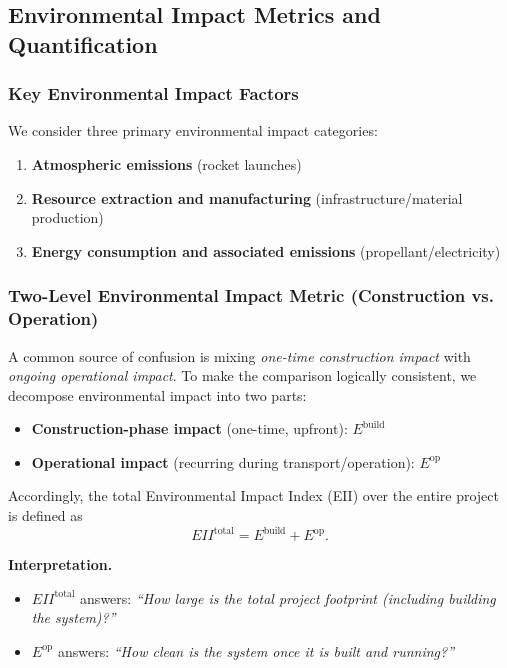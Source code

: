 \documentclass{mcmthesis}
\begin{document}

\subsection{Environmental Impact Metrics and Quantification}

\subsubsection{Key Environmental Impact Factors}

We consider three primary environmental impact categories:
\begin{enumerate}
    \item \textbf{Atmospheric emissions} (rocket launches)
    \item \textbf{Resource extraction and manufacturing} (infrastructure/material production)
    \item \textbf{Energy consumption and associated emissions} (propellant/electricity)
\end{enumerate}

\subsubsection{Two-Level Environmental Impact Metric (Construction vs. Operation)}

A common source of confusion is mixing \emph{one-time construction impact} with \emph{ongoing operational impact}.
To make the comparison logically consistent, we decompose environmental impact into two parts:

\begin{itemize}
    \item \textbf{Construction-phase impact} (one-time, upfront): $E^{\text{build}}$
    \item \textbf{Operational impact} (recurring during transport/operation): $E^{\text{op}}$
\end{itemize}

Accordingly, the total Environmental Impact Index (EII) over the entire project is defined as
\begin{equation}
    EII^{\text{total}} = E^{\text{build}} + E^{\text{op}}.
    \label{eq:eii_total_decomp}
\end{equation}

\noindent\textbf{Interpretation.}
\begin{itemize}
    \item $EII^{\text{total}}$ answers: \emph{``How large is the total project footprint (including building the system)?''}
    \item $E^{\text{op}}$ answers: \emph{``How clean is the system once it is built and running?''}
\end{itemize}
\end{document}
